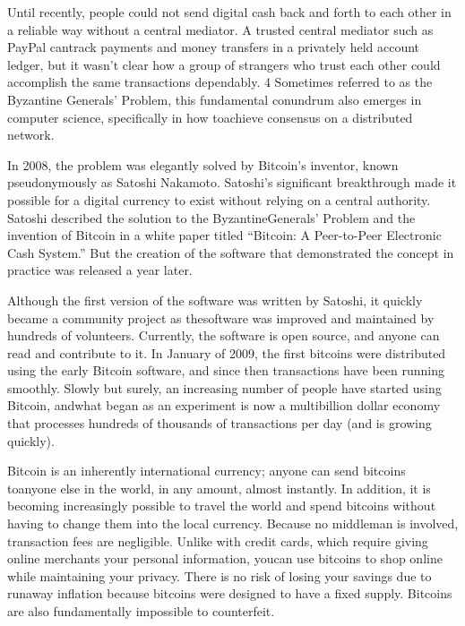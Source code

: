 \par Until recently, people could not send digital cash back and forth to each other in a reliable way without a central mediator. A trusted central mediator such as PayPal cantrack payments and money transfers in a privately held account ledger, but it wasn’t clear how a group of strangers who  trust each other could accomplish the same transactions dependably. 4 Sometimes referred to as the Byzantine Generals’ Problem, this fundamental conundrum also emerges in computer science, specifically in how toachieve consensus on a distributed network.

\par In 2008, the problem was elegantly solved by Bitcoin’s inventor, known pseudonymously as Satoshi Nakamoto. Satoshi’s significant breakthrough made it possible for a digital currency to exist without relying on a central authority. Satoshi described the solution to the ByzantineGenerals’ Problem and the invention of Bitcoin in a white paper titled “Bitcoin: A Peer-to-Peer Electronic Cash System.” But the creation of the software that demonstrated the concept in practice was released a year later.

\par Although the first version of the software was written by Satoshi, it quickly became a community project as thesoftware was improved and maintained by hundreds of volunteers. Currently, the software is open source, and anyone can read and contribute to it. In January of 2009, the first bitcoins were distributed using the early Bitcoin software, and since then transactions have been running smoothly. Slowly but surely, an increasing number of people have started using Bitcoin, andwhat began as an experiment is now a multibillion dollar economy that processes hundreds of thousands of transactions per day (and is growing quickly).


\par Bitcoin is an inherently international currency; anyone can send bitcoins toanyone else in the world, in any amount, almost instantly. In addition, it is becoming increasingly possible to travel the world and spend bitcoins without having to change them into the local currency. Because no middleman is involved, transaction fees are negligible. Unlike with credit cards, which require giving online merchants your personal information, youcan use bitcoins to shop online while maintaining your privacy. There is no risk of losing your savings due to runaway inflation because bitcoins were designed to have a fixed supply. Bitcoins are also fundamentally impossible to counterfeit.

